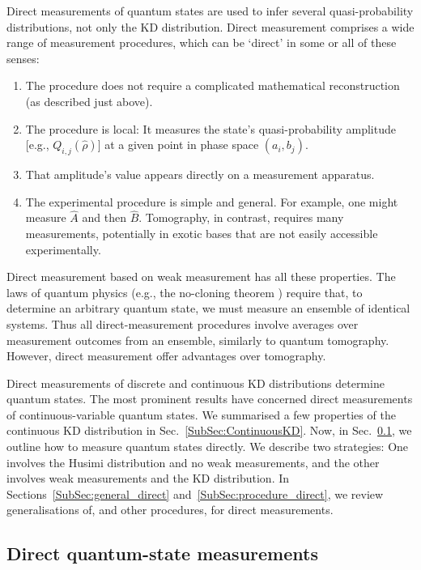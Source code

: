 \documentclass[%
 reprint,
superscriptaddress,
nofootinbib,
bibnotes,
 amsmath,amssymb,
 aps,
]{revtex4-1}
\theoremstyle{plain}
\begin{document}
Direct measurements of quantum states are 
used to 
infer several quasi-probability distributions, not only  the KD distribution. Direct measurement comprises a wide
range of measurement procedures, which can be `direct' in some or
all of these senses: 
\begin{enumerate}
   \item The procedure does not require a complicated mathematical
reconstruction (as described just above). 

   \item The procedure is local: It measures the state's quasi-probability amplitude [e.g., $Q_{i,j}(\hat{\rho})$] at a given point in phase space $(a_{i},b_{j})$. 
   
   \item That amplitude's value appears directly on a measurement apparatus. 
   
   \item The experimental procedure is simple and general. For example, one might measure $\hat{A}$ and then $\hat{B}$. Tomography, in contrast, requires many measurements, potentially in exotic bases that are not easily accessible experimentally.  
\end{enumerate}
Direct measurement based on weak measurement has all these properties.
The laws of quantum physics (e.g., the no-cloning theorem \cite{Wootters82}) require that, to determine an arbitrary quantum state, we must measure an  ensemble of identical systems. 
Thus all direct-measurement procedures involve averages over measurement outcomes from an ensemble, similarly to quantum tomography. However, direct measurement offer advantages over tomography.

Direct measurements of discrete and continuous KD distributions determine quantum states.
The most prominent results have concerned direct measurements of continuous-variable quantum states. We summarised a few properties of the continuous KD distribution in Sec.~\ref{SubSec:ContinuousKD}. Now, in Sec.~\ref{SubSec:KDMeas}, we outline how to measure quantum states directly. We describe two strategies: One involves the Husimi distribution and no weak measurements, and the other involves weak measurements and the KD distribution.
In  Sections~\ref{SubSec:general_direct} and~\ref{SubSec:procedure_direct}, we review generalisations of, and other procedures, for direct measurements. 


\subsection{Direct quantum-state measurements}
\label{SubSec:KDMeas}
\end{document}

